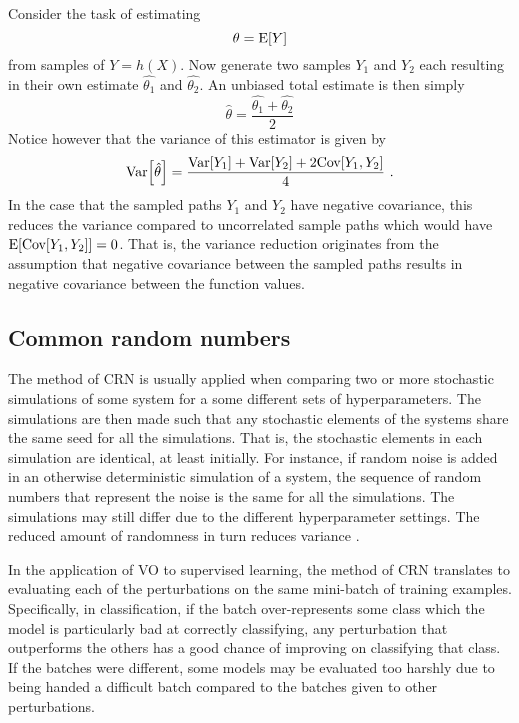 Consider the task of estimating
\begin{equation}
    \theta = \text{E}{\left[Y\right]}
\end{equation}
from samples of $Y=h(X)$. Now generate two samples $Y_1$ and $Y_2$ each resulting in their own estimate $\hat{\theta_1}$ and $\hat{\theta_2}$. An unbiased total estimate is then simply
\begin{equation}
    \hat{\theta} = \frac{\hat{\theta_1} + \hat{\theta_2}}{2}
\end{equation}
Notice however that the variance of this estimator is given by
\begin{equation}
    \text{Var}{\left[\hat{\theta}\right]} = \frac{\text{Var}{\left[Y_1\right]} + \text{Var}{\left[Y_2\right]} + 2\text{Cov}{\left[Y_1,Y_2\right]}}{4} \ .
\end{equation}
In the case that the sampled paths $Y_1$ and $Y_2$ have negative covariance, this reduces the variance compared to uncorrelated sample paths which would have $\text{E}{\left[\text{Cov}{\left[Y_1,Y_2\right]}\right]}=0$. That is, the variance reduction originates from the assumption that negative covariance between the sampled paths results in negative covariance between the function values.
\fi










\subsection{Common random numbers}\label{sec: Theory: Common random numbers}
The method of \gls{CRN} is usually applied when comparing two or more stochastic simulations of some system for a some different sets of hyperparameters. The simulations are then made such that any stochastic elements of the systems share the same seed for all the simulations. That is, the stochastic elements in each simulation are identical, at least initially. For instance, if random noise is added in an otherwise deterministic simulation of a system, the sequence of random numbers that represent the noise is the same for all the simulations. The simulations may still differ due to the different hyperparameter settings.  The reduced amount of randomness in turn reduces variance \cite{Glasserman2003}.

In the application of \gls{VO} to supervised learning, the method of \gls{CRN} translates to evaluating each of the perturbations on the same mini-batch of training examples. Specifically, in classification, if the batch over-represents some class which the model is particularly bad at correctly classifying, any perturbation that outperforms the others has a good chance of improving on classifying that class. If the batches were different, some models may be evaluated too harshly due to being handed a difficult batch compared to the batches given to other perturbations.

